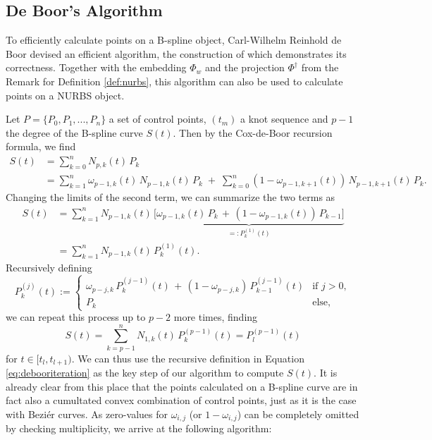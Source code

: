 \documentclass[a4paper, 11pt]{report}
\theoremstyle{definition}
\begin{document}
\subsection{De Boor's Algorithm}
	To efficiently calculate points on a B-spline object, Carl-Wilhelm Reinhold de Boor devised an efficient algorithm, the construction of which demonstrates its correctness. Together with the embedding $\Phi_w$ and the projection $\Phi^\dagger$ from the Remark for Definition \ref{def:nurbs}, this algorithm can also be used to calculate points on a NURBS object.

	Let $P = \{P_0, P_1, ..., P_n\}$ a set of control points, $(t_m)$ a knot sequence and $p-1$ the degree of the B-spline curve $S(t)$. Then by the Cox-de-Boor recursion formula, we find
	\begin{align*}
		S(t) 	&= \sum_{k=0}^n N_{p,k}(t) \, P_k \\
				&= \sum_{k=1}^n \omega_{p-1,k}(t) \, N_{p-1, k}(t) \, P_k  \; + \; \sum_{k=0}^n \left( 1-\omega_{p-1,k+1}(t) \right) \, N_{p-1, k+1}(t) \, P_k.
	\end{align*}
	Changing the limits of the second term, we can summarize the two terms as
	\begin{align*} 
		S(t) 	&= \sum_{k=1}^n N_{p-1, k}(t) \, \underbrace{\Big[ \omega_{p-1,k}(t) \, P_k  \, + \, \left( 1-\omega_{p-1,k}(t) \right) \, P_{k-1} \Big]}_{=: P_k^{(1)}(t)} \\
				&= \sum_{k=1}^n N_{p-1, k}(t) \, P_k^{(1)}(t).
	\end{align*}
	Recursively defining
	\begin{equation}\label{eq:debooriteration}
		P^{(j)}_k(t) := \begin{cases}
			\omega_{p-j, k} \, P^{(j-1)}_k(t) \, + \, (1-\omega_{p-j, k}) \, P^{(j-1)}_{k-1}(t) 	&\text{if } j > 0,\\
			P_k 																					&\text{else},
		\end{cases}
	\end{equation}
	we can repeat this process up to $p-2$ more times, finding
	$$ S(t) = \sum_{k=p-1}^n N_{1, k}(t) \, P^{(p-1)}_k(t) = P^{(p-1)}_l(t)$$
	for $t \in [t_l, t_{l+1})$. We can thus use the recursive definition in Equation \ref{eq:debooriteration} as the key step of our algorithm to compute $S(t)$. It is already clear from this place that the points calculated on a B-spline curve are in fact also a cumultated convex combination of control points, just as it is the case with Beziér curves. As zero-values for $\omega_{i,j}$ (or $1-\omega_{i,j}$) can be completely omitted by checking multiplicity, we arrive at the following algorithm:
\end{document}
